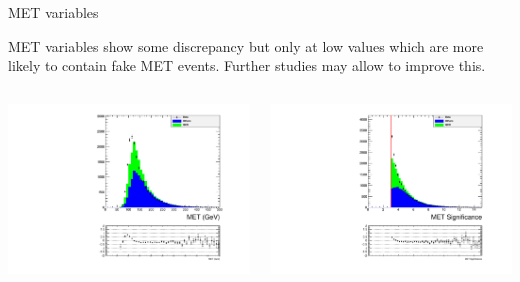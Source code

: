\documentclass[8pt]{beamer}
\begin{document}
\begin{frame}{MET variables}

MET variables show some discrepancy but only at low values which are more likely to contain fake MET events. Further studies may allow to improve this.

\begin{columns}
 
\begin{block}{}
 
\includegraphics[width=\linewidth]{img/DEta3p6_MetSig3p0_MinDPhiJetsMet1p5/met.pdf}

\end{block}

\begin{block}
 
\includegraphics[width=\linewidth]{img/DEta3p6_MetSig3p0_MinDPhiJetsMet1p5/metSig.pdf}
 
\end{block}

\end{columns}

\end{frame}
\end{document}
